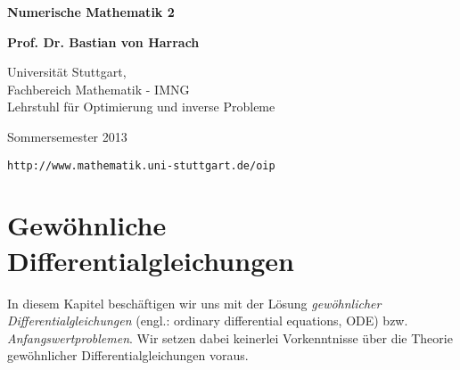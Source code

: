 \documentclass[12pt,a4paper]{book}
\theoremstyle{break}
\theoremstyle{nonumberplain}
\newcommand{\1}{\mathbbm{1}} 			      	%
\begin{document}
%
%

\begin{titlepage}

\begin{center}
    \textbf{\Huge \sc Numerische Mathematik 2 }
\end{center}

\vspace{3cm}

\begin{center}

{\Large \bf Prof. Dr. Bastian von Harrach}

\vspace{1cm}

{\Large Universität Stuttgart,\\[+1ex] Fachbereich Mathematik - IMNG\\[+1ex]
Lehrstuhl für Optimierung und inverse Probleme}

\vspace{1cm}

{\Large Sommersemester 2013}

\vspace{2cm}

{\verb|http://www.mathematik.uni-stuttgart.de/oip|}

\end{center} 
\end{titlepage}


\thispagestyle{empty}
\cleardoublepage
% 
%



\tableofcontents

\cleardoublepage
{}






\chapter[Gewöhnliche Differentialgleichungen]{Gewöhnliche Differentialgleichungen}

In diesem Kapitel beschäftigen wir uns mit der Lösung \emph{gewöhnlicher Differentialgleichungen} (engl.: ordinary differential equations, ODE) 
bzw. \emph{Anfangswertproblemen}. Wir setzen dabei keinerlei Vorkenntnisse über die Theorie gewöhnlicher Differentialgleichungen voraus.
\end{document}
